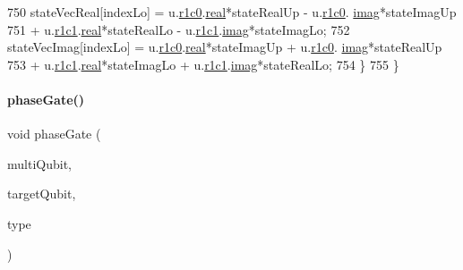 \begin{DoxyCode}
750         stateVecReal[indexLo] = u.\mbox{\hyperlink{structComplexMatrix2_ab98282015ed2065e53fbc9638e2583ab}{r1c0}}.\mbox{\hyperlink{structComplex_a479ad939835457595fcca3ca55c06283}{real}}*stateRealUp  - u.\mbox{\hyperlink{structComplexMatrix2_ab98282015ed2065e53fbc9638e2583ab}{r1c0}}.
      \mbox{\hyperlink{structComplex_a1151948284b21c0052f203f23ab931d9}{imag}}*stateImagUp 
751             + u.\mbox{\hyperlink{structComplexMatrix2_a763007c3070802373549ba0350f83c8a}{r1c1}}.\mbox{\hyperlink{structComplex_a479ad939835457595fcca3ca55c06283}{real}}*stateRealLo  -  u.\mbox{\hyperlink{structComplexMatrix2_a763007c3070802373549ba0350f83c8a}{r1c1}}.\mbox{\hyperlink{structComplex_a1151948284b21c0052f203f23ab931d9}{imag}}*stateImagLo;
752         stateVecImag[indexLo] = u.\mbox{\hyperlink{structComplexMatrix2_ab98282015ed2065e53fbc9638e2583ab}{r1c0}}.\mbox{\hyperlink{structComplex_a479ad939835457595fcca3ca55c06283}{real}}*stateImagUp + u.\mbox{\hyperlink{structComplexMatrix2_ab98282015ed2065e53fbc9638e2583ab}{r1c0}}.
      \mbox{\hyperlink{structComplex_a1151948284b21c0052f203f23ab931d9}{imag}}*stateRealUp 
753             + u.\mbox{\hyperlink{structComplexMatrix2_a763007c3070802373549ba0350f83c8a}{r1c1}}.\mbox{\hyperlink{structComplex_a479ad939835457595fcca3ca55c06283}{real}}*stateImagLo + u.\mbox{\hyperlink{structComplexMatrix2_a763007c3070802373549ba0350f83c8a}{r1c1}}.\mbox{\hyperlink{structComplex_a1151948284b21c0052f203f23ab931d9}{imag}}*stateRealLo;
754     \}
755 \}
\end{DoxyCode}
\mbox{\label{QuEST__env__localGPU_8cu_aae7a8a7f1ccbddb7f76b6c52b746bb43}} 
\paragraph{\texorpdfstring{phase\+Gate()}{phaseGate()}}
{\footnotesize\ttfamily void phase\+Gate (\begin{DoxyParamCaption}\item[{\mbox{\hyperlink{structMultiQubit}{Multi\+Qubit}}}]{multi\+Qubit,  }\item[{const int}]{target\+Qubit,  }\item[{enum \mbox{\hyperlink{QuEST_8h_a5739021c733cecc49647956b2f7338ea}{phase\+Gate\+Type}}}]{type }\end{DoxyParamCaption})}



